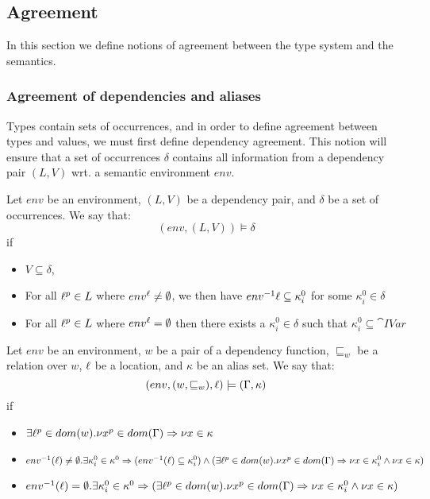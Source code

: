 \documentclass[acmsmall,sigplan]{acmart}
\begin{document}
\subsection{Agreement}
In this section we define notions of agreement between the type system and the
semantics.

\subsubsection{Agreement of dependencies and aliases}

Types contain sets of occurrences, and in order to define agreement
between types and values, we must first define dependency
agreement. This notion will ensure that a set of occurrences $\delta$
contains all information from a dependency pair $(L,V)$ wrt. a
semantic environment $env$.

\begin{definition}\label{def:DepAgree}
	Let $env$ be an environment, $(L,V)$ be a dependency pair, and $\delta$ be a set of occurrences.
	We say that:
	$$(env,(L,V))\models\delta$$
	if
	\begin{itemize}
		\item $V\subseteq\delta$,
		\item For all $\ell^p\in L$ where
                  $env^{\ell}\neq\emptyset$, we then have $env^{-1} \ell \subseteq \kappa_i^0$ for some $\kappa_i^0\in\delta$
		\item For all $\ell^p\in L$ where $env^{\ell}=\emptyset$ then there exists a $\kappa_i^0\in\delta$ such that $\kappa_i^0\subseteq\cat{IVar}$
	\end{itemize}
      \end{definition}

      \begin{definition}\label{def:AliasAgree}
	Let $env$ be an environment, $w$ be a pair of a dependency function, $\sqsubseteq_w$ be a relation over $w$, $\ell$ be a location, and $\kappa$ be an alias set.
	We say that:
	$$(env,(w,\sqsubseteq_w),\ell)\models(\Gamma,\kappa)$$
	if
	\begin{itemize}
		\item $\exists \ell^p\in dom(w).\nu x^p\in dom(\Gamma)\Rightarrow\nu x\in\kappa$
		\item $env^{-1}(\ell)\neq\emptyset.\exists \kappa^0_i\in\kappa^0\Rightarrow
			(env^{-1}(\ell)\subseteq\kappa^0_i)\wedge(\exists \ell^p\in dom(w).\nu x^p\in dom(\Gamma)\Rightarrow\\\nu x\in\kappa^0_i\wedge\nu x\in\kappa)$
		\item $env^{-1}(\ell)=\emptyset.\exists \kappa^0_i\in\kappa^0\Rightarrow
			(\exists \ell^p\in dom(w).\nu x^p\in dom(\Gamma)\Rightarrow\nu x\in\kappa^0_i\wedge\nu x\in\kappa)$
	\end{itemize}
\end{definition}
\end{document}
